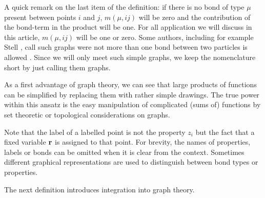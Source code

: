 \documentclass[8.5pt,twoside,twocolumn]{article}
\theoremstyle{standard}
\begin{document}
A quick remark on the last item of the definition: if there is no bond of type $\mu$ present between
points $i$ and $j$, $m(\mu,ij)$ will be zero and the contribution of the bond-term in the product will
be one. For all application we will discuss in this article, $m(\mu,ij)$ will
be one or zero. Some authors, including for example Stell \cite{Stell}, call such
graphs were not more than one bond between two particles is allowed . Since we will only meet such simple graphs, we keep the nomenclature
short by just calling them graphs.

As a first advantage of graph theory, we can see that large products of functions can be simplified
by replacing them with rather simple drawings. The true power within this ansatz is the easy
manipulation of complicated (sums of) functions by set theoretic
or topological considerations on graphs.

Note that the label of a labelled point is not the property $z_i$ but the fact
that a fixed variable $\mathbf{r}$ is assigned to that point. For brevity, the names
of properties, labels or bonds can be omitted when it is clear from the
context. Sometimes different graphical representations are used to distinguish
between bond types or properties.

The next definition introduces integration into graph theory.
\end{document}
